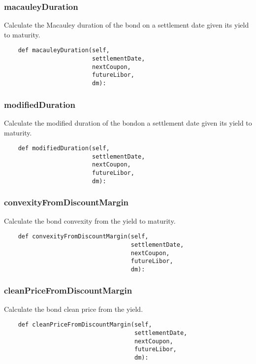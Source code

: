 \documentclass[twoside,11pt]{book}
\begin{document}
\subsubsection*{{\bf macauleyDuration}}
Calculate the Macauley duration of the bond on a settlement date given its yield to maturity.  

\begin{lstlisting}
    def macauleyDuration(self,
                         settlementDate,
                         nextCoupon,
                         futureLibor,
                         dm):
\end{lstlisting}

\subsubsection*{{\bf modifiedDuration}}
Calculate the modified duration of the bondon a settlement date given its yield to maturity.  

\begin{lstlisting}
    def modifiedDuration(self,
                         settlementDate,
                         nextCoupon,
                         futureLibor,
                         dm):
\end{lstlisting}

\subsubsection*{{\bf convexityFromDiscountMargin}}
Calculate the bond convexity from the yield to maturity.  

\begin{lstlisting}
    def convexityFromDiscountMargin(self,
                                    settlementDate,
                                    nextCoupon,
                                    futureLibor,
                                    dm):
\end{lstlisting}

\subsubsection*{{\bf cleanPriceFromDiscountMargin}}
Calculate the bond clean price from the yield.  

\begin{lstlisting}
    def cleanPriceFromDiscountMargin(self,
                                     settlementDate,
                                     nextCoupon,
                                     futureLibor,
                                     dm):
\end{lstlisting}
\end{document}
